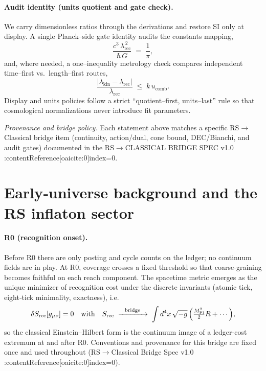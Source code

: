 \documentclass[11pt]{article}
\begin{document}
\paragraph{Audit identity (units quotient and gate check).}
We carry dimensionless ratios through the derivations and restore SI only at display. A single Planck–side gate identity audits the constants mapping,
\begin{equation}
  \frac{c^3\,\lambda_{\mathrm{rec}}^{\,2}}{\hbar\,G} \;=\; \frac{1}{\pi},
\end{equation}
and, where needed, a one–inequality metrology check compares independent time–first vs.\ length–first routes,
\begin{equation}
  \frac{|\lambda_{\mathrm{kin}}-\lambda_{\mathrm{rec}}|}{\lambda_{\mathrm{rec}}} \;\le\; k\,u_{\mathrm{comb}}.
\end{equation}
Display and units policies follow a strict “quotient–first, units–last” rule so that cosmological normalizations never introduce fit parameters.

\medskip\noindent
\emph{Provenance and bridge policy.} Each statement above matches a specific RS\(\to\)Classical bridge item (continuity, action/dual, cone bound, DEC/Bianchi, and audit gates) documented in the RS\(\to\)CLASSICAL BRIDGE SPEC v1.0 :contentReference[oaicite:0]{index=0}.

\section{Early‑universe background and the RS inflaton sector}

\paragraph{R0 (recognition onset).}
Before R0 there are only posting and cycle counts on the ledger; no continuum fields are in play. At R0, coverage crosses a fixed threshold so that coarse‑graining becomes faithful on each reach component. The spacetime metric emerges as the unique minimizer of recognition cost under the discrete invariants (atomic tick, eight‑tick minimality, exactness), i.e.
\[
  \delta S_{\rm rec}[g_{\mu\nu}] = 0
  \quad\text{with}\quad
  S_{\rm rec} \;\xrightarrow{\ \ \text{bridge}\ \ }\; \int d^4x\,\sqrt{-g}\,\Big(\tfrac{M_{\rm Pl}^2}{2}R + \cdots\Big),
\]
so the classical Einstein–Hilbert form is the continuum image of a ledger‑cost extremum at and after R0. Conventions and provenance for this bridge are fixed once and used throughout (RS\(\to\)Classical Bridge Spec v1.0 :contentReference[oaicite:0]{index=0}).
\end{document}
